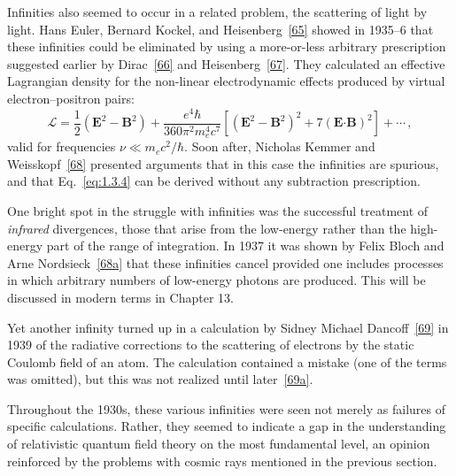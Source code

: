 Infinities also seemed to occur in a related problem, the scattering of light by light. Hans Euler, Bernard Kockel, and Heisenberg~\hyperref[ref:1.65]{[65]} showed in 1935--6 that these infinities could be eliminated by using a more-or-less arbitrary prescription suggested earlier by Dirac~\hyperref[ref:1.66]{[66]} and Heisenberg~\hyperref[ref:1.67]{[67]}. They calculated an effective Lagrangian density for the non-linear electrodynamic effects produced by virtual electron--positron pairs:
\begin{equation}
  \mathcal{L}=\frac{1}{2}\left(\mathbf{E}^2-\mathbf{B}^2\right)
  +\frac{e^4\hbar}{360\pi^2m_e^4c^7}
  \left[\left(\mathbf{E}^2-\mathbf{B}^2\right)^2
  +7\left(\mathbf{E}\mathbin{\boldsymbol{\cdot}}\mathbf{B}\right)^2\right]+\cdots\,,
  \tag{1.3.4}\label{eq:1.3.4}
\end{equation}
valid for frequencies $\nu\ll m_ec^2/\hbar$. Soon after, Nicholas Kemmer and Weisskopf~\hyperref[ref:1.68]{[68]} presented arguments that in this case the infinities are spurious, and that Eq.~\eqref{eq:1.3.4} can be derived without any subtraction prescription.

One bright spot in the struggle with infinities was the successful treatment of \emph{infrared} divergences, those that arise from the low-energy rather than the high-energy part of the range of integration. In 1937 it was shown by Felix Bloch and Arne Nordsieck~\hyperref[ref:1.68a]{[68a]} that these infinities cancel provided one includes processes in which arbitrary numbers of low-energy photons are produced. This will be discussed in modern terms in Chapter 13.

Yet another infinity turned up in a calculation by Sidney Michael Dancoff~\hyperref[ref:1.69]{[69]} in 1939 of the radiative corrections to the scattering of electrons by the static Coulomb field of an atom. The calculation contained a mistake (one of the terms was omitted), but this was not realized until later~\hyperref[ref:1.69a]{[69a]}.

Throughout the 1930s, these various infinities were seen not merely as failures of specific calculations. Rather, they seemed to indicate a gap in the understanding of relativistic quantum field theory on the most fundamental level, an opinion reinforced by the problems with cosmic rays mentioned in the previous section.

